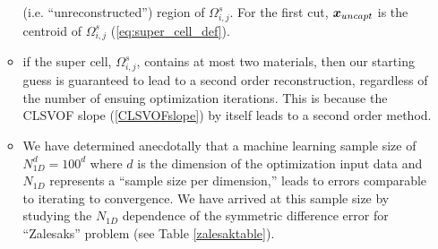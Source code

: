 \documentclass[]{article}
\newcommand{\bmx}{\mbox{\boldmath $x$\unboldmath}}
\begin{document}
\begin{enumerate}
\begin{itemize}
    (i.e. ``unreconstructed'') region of
    $\Omega_{i,j}^s$.  For the first cut,  
    $\bmx_{uncapt}$ is the centroid of 
    $\Omega_{i,j}^s$ 
    (\ref{eq:super_cell_def}).
   \item if the super cell, $\Omega_{i,j}^s$, contains at most two
    materials, then our starting guess is guaranteed to lead to a 
    second order reconstruction, regardless of the number of ensuing 
    optimization iterations.  This is because the CLSVOF slope
    (\ref{CLSVOFslope}) by 
    itself leads to a second order method.  
   \item We have determined 
    anecdotally that a machine learning sample size of 
    $N_{1D}^{d}=100^{d}$
    where $d$ is the dimension of the optimization input data and 
    $N_{1D}$ represents a ``sample size per dimension,'' leads
    to errors comparable to iterating to convergence.  We have 
    arrived at this sample size by 
    studying the $N_{1D}$ dependence
    of the symmetric difference error for ``Zalesaks'' problem 
    (see Table \ref{zalesaktable}).
   \end{itemize}
\end{enumerate}
\end{document}
